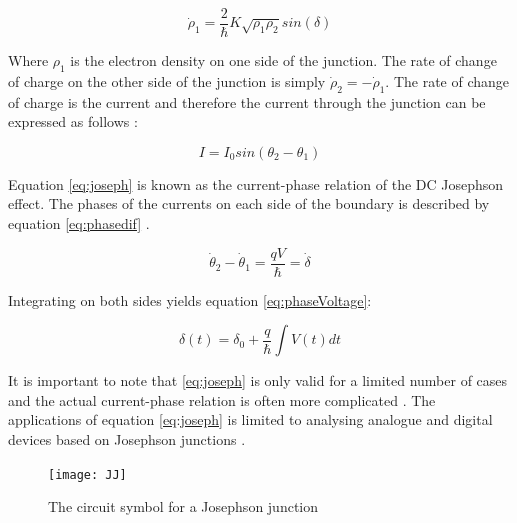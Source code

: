 \begin{equation}
    \dot\rho_1 = \frac{2}{\hbar}K\sqrt{\rho_1\rho_2}sin(\delta)
    \label{eq:charge_dens}
\end{equation}

Where $\rho_1$ is the electron density on one side of the junction. The rate of change of charge on the other side of the junction is simply $\dot\rho_2 = -\dot\rho_1$\cite{Feynman_Leighton_Sands_2013}. The rate of change of charge is the current and therefore the current through the junction can be expressed as follows \cite{CPRJJ}:

\begin{equation}
    I = I_0sin(\theta_2 - \theta_1)
    \label{eq:joseph}
\end{equation}

Equation \ref{eq:joseph} is known as the current-phase relation of the DC Josephson effect.
The phases of the currents on each side of the boundary is described by equation \ref{eq:phasedif} \cite{Feynman_Leighton_Sands_2013}.

\begin{equation}
    \dot\theta_2 - \dot\theta_1 = \frac{qV}{\hbar} = \dot\delta
    \label{eq:phasedif}
\end{equation}

Integrating on both sides yields equation \ref{eq:phaseVoltage}:

\begin{equation}
    \delta(t) = \delta_0 + \frac{q}{\hbar}\int V(t) dt
    \label{eq:phaseVoltage}
\end{equation}

It is important to note that \ref{eq:joseph} is only valid for a limited number of cases and the actual current-phase relation is often more complicated \cite{CPRJJ}. The applications of equation \ref{eq:joseph} is limited to analysing analogue and digital devices based on Josephson junctions \cite{CPRJJ}.

\begin{figure}[h]
    \centering
    \texttt{[image: JJ]}
    \label{fig:JJ}
    \caption{The circuit symbol for a Josephson junction}
\end{figure}

